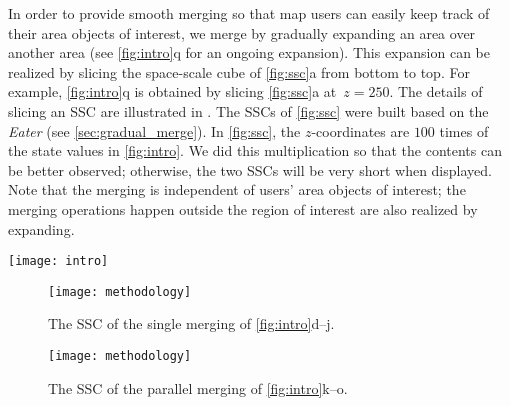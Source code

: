 \documentclass{ica}
\begin{document}
In order to provide smooth merging
so that map users can easily keep track of their area objects of interest,
we merge by gradually expanding an area over another area
(see \fig\ref{fig:intro}q for an ongoing expansion).
This expansion can be realized 
by slicing the space-scale cube \citep[SSC,][]{vanOosterom2014Support} 
of \fig\ref{fig:ssc}a from bottom to top.
For example,  \fig\ref{fig:intro}q is obtained by slicing
\fig\ref{fig:ssc}a at~$z= 250$.
The details of slicing an SSC are illustrated in \citet{Meijers2020Web}.
The SSCs of \fig\ref{fig:ssc} were built 
based on the \emph{Eater}
(see \sect\ref{sec:gradual_merge}).
In \fig\ref{fig:ssc}, the $z$-coordinates are $100$ times of
the state values in \fig\ref{fig:intro}.
We did this multiplication so that the contents can be better observed;
otherwise, the two SSCs will be very short when displayed.
Note that the merging is independent of users' area objects of interest;
the merging operations happen outside the region of interest 
are also realized by expanding.





\begin{figure*}[tb]
\centering
\texttt{[image: intro]}
\caption{A comparison of different scale-transition strategies.
Each arrow inside the subfigures indicates a merging operation.
The arrow in the right-hand side indicates the states of zooming out.
%
(a--c): All changes are processed in one go.
(d--j): All changes are sequenced one by one rapidly.
(k--o): Changes are grouped, resulting in more animation duration for every change.
%
The numbers are the face IDs.
}
\label{fig:intro}
\end{figure*}



\begin{figure*}[htb]
\centering
\begin{subfigure}[t]{0.48\textwidth}
\centering
\texttt{[image: methodology]}
\caption{The SSC of the single merging of \figs\ref{fig:intro}d--j.}
\end{subfigure}
\hfill
\begin{subfigure}[t]{0.48\textwidth}
\centering
\texttt{[image: methodology]}
\caption{The SSC of the parallel merging of \figs\ref{fig:intro}k--o.}
\end{subfigure}
\caption{
In the left SSC, only one merging event is happening 
at a specific state ($z$-dimension), 
while in the right SSC multiple merging events may happen at the same state.
}
\label{fig:ssc}
\end{figure*}
\end{document}
